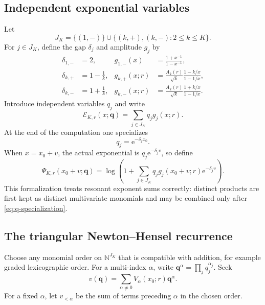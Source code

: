 \documentclass[11pt,a4paper]{article}
\numberwithin{equation}{section}
\theoremstyle{remark}
\newcommand{\e}{\mathrm e}
\newcommand{\NN}{\mathbb N}
\newcommand{\Ecal}{\mathcal E}
\begin{document}
\subsection{Independent exponential variables}

Let
\begin{equation}\label{eq:JK}
 J_K=\{(1,-)\}\cup\{(k,+),(k,-):2\le k\le K\}.
\end{equation}
For $j\in J_K$, define the gap $\delta_j$ and amplitude $g_j$ by
\begin{align}
 \delta_{1,-}&=2,&
 g_{1,-}(x)&=\frac{1+x^{-1}}{1-x^{-1}},\label{eq:g1minus}\\
 \delta_{k,+}&=1-\frac1k,&
 g_{k,+}(x;r)&=\frac{A_k(r)}{\sqrt{k}}
 \frac{1-k/x}{1-1/x},\label{eq:gkplus}\\
 \delta_{k,-}&=1+\frac1k,&
 g_{k,-}(x;r)&=\frac{A_k(r)}{\sqrt{k}}
 \frac{1+k/x}{1-1/x}.
 \label{eq:gkminus}
\end{align}
Introduce independent variables $q_j$ and write
\begin{equation}\label{eq:E-formal}
 \Ecal_{K,r}(x;\bm q)=\sum_{j\in J_K}q_jg_j(x;r).
\end{equation}
At the end of the computation one specializes
\begin{equation}\label{eq:q-specialization}
 q_j=\e^{-\delta_jx_0}.
\end{equation}
When $x=x_0+v$, the actual exponential is
$q_j\e^{-\delta_jv}$, so define
\begin{equation}\label{eq:Psi-formal-v}
 \Psi_{K,r}(x_0+v;\bm q)
 =\log\!\left(
 1+\sum_{j\in J_K}q_j
 g_j(x_0+v;r)\e^{-\delta_jv}
 \right).
\end{equation}
This formalization treats resonant exponent sums correctly: distinct products are first kept as distinct multivariate monomials and may be combined only after \cref{eq:q-specialization}.

\subsection{The triangular Newton--Hensel recurrence}

Choose any monomial order on $\NN^{J_K}$ that is compatible with addition, for example graded lexicographic order.  For a multi-index $\alpha$, write
$\bm q^\alpha=\prod_jq_j^{\alpha_j}$.  Seek
\begin{equation}\label{eq:v-multi}
 v(\bm q)=\sum_{\alpha\ne0}V_\alpha(x_0;r)\bm q^\alpha.
\end{equation}
For a fixed $\alpha$, let $v_{<\alpha}$ be the sum of terms preceding $\alpha$ in the chosen order.
\end{document}
